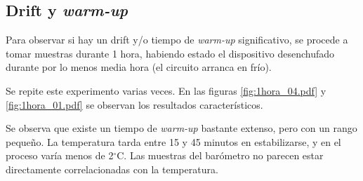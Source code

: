 \documentclass[main]{subfiles}
\newcommand{\degc}{$^\circ$C}
\begin{document}
\subsection{Drift y \textit{warm-up}}
\label{sec:drift-y-warm-up}

Para observar si hay un drift y/o tiempo de \textit{warm-up} significativo, se procede a tomar muestras durante 1 hora, habiendo estado el dispositivo desenchufado durante por lo menos media hora (el circuito arranca en frío).

Se repite este experimento varias veces. En las figuras \ref{fig:1hora_04.pdf} y \ref{fig:1hora_01.pdf} se observan los resultados característicos.

\begin{figure}[h!]
\hspace{-50pt}
\caption{}
\end{figure}
\vspace{-10pt}

Se observa que existe un tiempo de \textit{warm-up} bastante extenso, pero con un rango pequeño. La temperatura tarda entre 15 y 45 minutos en estabilizarse, y en el proceso varía menos de 2\degc. Las muestras del barómetro no parecen estar directamente correlacionadas con la temperatura.
\end{document}
